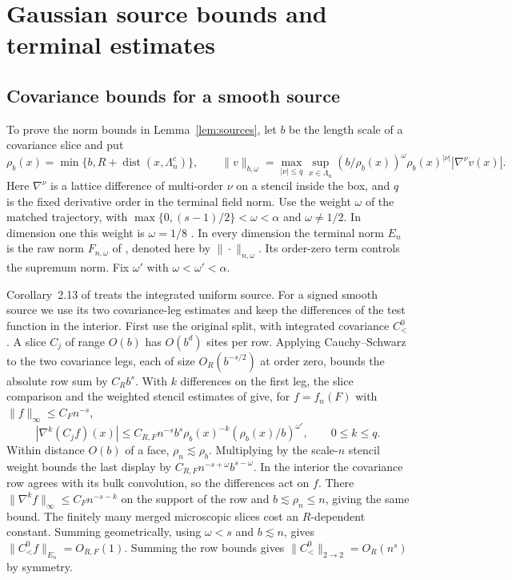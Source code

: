 \documentclass[11pt]{article}
\numberwithin{equation}{section}
\begin{document}
\section{Gaussian source bounds and terminal estimates}\label{app:slices}
\subsection{Covariance bounds for a smooth source}

To prove the norm bounds in Lemma~\ref{lem:sources}, let $b$ be the
length scale of a covariance slice and put
\begin{equation}
 \rho_b(x)=\min\{b,R+\operatorname{dist}(x,\Lambda_n^c)\},\qquad
 \|v\|_{b,\omega}=\max_{|\nu|\le q}\sup_{x\in\Lambda_n}
   (b/\rho_b(x))^\omega\rho_b(x)^{|\nu|}|\nabla^\nu v(x)|.
\end{equation}
Here $\nabla^\nu$ is a lattice difference of multi-order $\nu$ on a
stencil inside the box, and $q$ is the fixed derivative order in the
terminal field norm. Use the weight $\omega$ of the matched trajectory,
with $\max\{0,(s-1)/2\}<\omega<\alpha$ and $\omega\ne1/2$.
In dimension one this weight is $\omega=1/8$
\cite[Proposition~7.14]{base}. In every dimension the terminal norm
$E_n$ is the raw norm $F_{n,\omega}$ of \cite[Section~7.1]{base},
denoted here by $\|\cdot\|_{n,\omega}$. Its order-zero term controls
the supremum norm. Fix $\omega'$ with $\omega<\omega'<\alpha$.

Corollary~2.13 of \cite{base} treats the integrated uniform source.
For a signed smooth source we use its two covariance-leg estimates
and keep the differences of the test function in the interior.
First use the original split, with integrated covariance $C_<^0$.
A slice $C_j$ of range $O(b)$ has $O(b^d)$ sites per row. Applying
Cauchy--Schwarz to the two covariance legs, each of size
$O_R(b^{-s/2})$ at order zero, bounds the absolute row sum by
$C_R b^s$. With $k$ differences on the first leg, the slice comparison
and the weighted stencil estimates of
\cite[Lemma~2.8, Proposition~2.9 and Lemmas~2.10--2.11]{base}
give, for $f=f_n(F)$ with $\|f\|_\infty\le C_F n^{-s}$,
\begin{equation}
 |\nabla^k(C_j f)(x)|\le C_{R,F} n^{-s} b^s
       \rho_b(x)^{-k}(\rho_b(x)/b)^{\omega'},\qquad 0\le k\le q .
\end{equation}
Within distance $O(b)$ of a face, $\rho_n\lesssim\rho_b$. Multiplying
by the scale-$n$ stencil weight bounds the last display by
$C_{R,F}n^{-s+\omega}b^{s-\omega}$. In the interior the covariance
row agrees with its bulk convolution, so the differences act on $f$.
There $\|\nabla^k f\|_\infty\le C_F n^{-s-k}$ on the support of
the row and $b\lesssim\rho_n\le n$, giving the same bound. The
finitely many merged microscopic slices cost an $R$-dependent
constant. Summing geometrically, using $\omega<s$ and $b\lesssim n$,
gives $\|C_<^0 f\|_{E_n}=O_{R,F}(1)$. Summing the row bounds gives
$\|C_<^0\|_{2\to2}=O_R(n^s)$ by symmetry.
\end{document}
